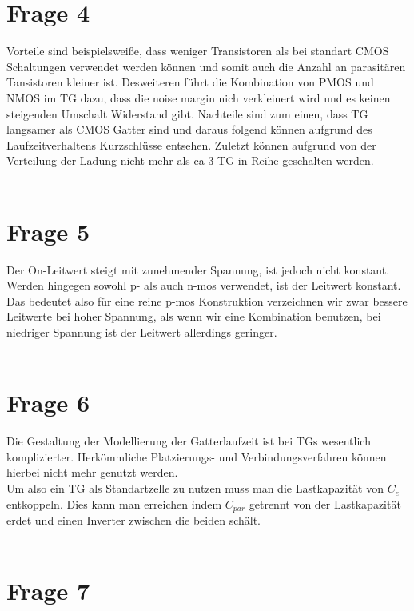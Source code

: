\documentclass[a4paper]{scrartcl}
\begin{document}
\section*{Frage 4}
Vorteile sind beispielsweiße, dass weniger Transistoren als bei standart CMOS Schaltungen verwendet werden können und somit auch die Anzahl an parasitären Tansistoren kleiner ist. Desweiteren führt die Kombination von PMOS und NMOS im TG dazu, dass die noise margin nich verkleinert wird und es keinen steigenden Umschalt Widerstand gibt.
Nachteile sind zum einen, dass TG langsamer als CMOS Gatter sind und daraus folgend können aufgrund des Laufzeitverhaltens Kurzschlüsse entsehen. Zuletzt können aufgrund von der Verteilung der Ladung nicht mehr als ca 3 TG in Reihe geschalten werden.
~\\
~\\
\section*{Frage 5}
Der On-Leitwert steigt mit zunehmender Spannung, ist jedoch nicht konstant. Werden hingegen sowohl p- als auch n-mos verwendet, ist der Leitwert konstant.\\
Das bedeutet also für eine reine p-mos Konstruktion verzeichnen wir zwar bessere Leitwerte bei hoher Spannung, als wenn wir eine Kombination benutzen, bei niedriger Spannung ist der Leitwert allerdings geringer.
~\\
~\\
\section*{Frage 6}
Die Gestaltung  der Modellierung der Gatterlaufzeit ist bei TGs wesentlich komplizierter. Herkömmliche Platzierungs- und Verbindungsverfahren können hierbei nicht mehr genutzt werden.\\
Um also ein TG als Standartzelle zu nutzen muss man die Lastkapazität von $C_e$ entkoppeln. Dies kann man erreichen indem $C_{par}$ getrennt von der Lastkapazität erdet und einen Inverter zwischen die beiden schält.
~\\
~\\
\section*{Frage 7}

~\\
~\\
\end{document}
